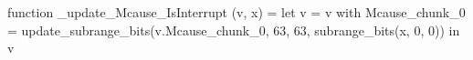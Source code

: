 function _update_Mcause_IsInterrupt (v, x) = let v = { v with Mcause_chunk_0 = update_subrange_bits(v.Mcause_chunk_0, 63, 63, subrange_bits(x, 0, 0)) } in
  v
